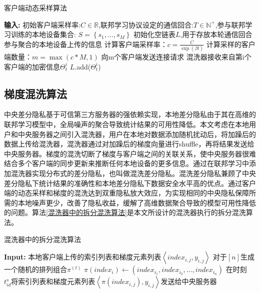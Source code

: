 \begin{algorithm}[!htb]
	\caption{客户端动态采样算法}
	\label{客户端动态采样算法}
	\begin{algorithmic}[1]
		\footnotesize
		\STATE \textbf{输入:} 初始客户端采样率:$C \in \mathbb{R}$,联邦学习协议设定的通信回合:$T \in \mathbb{N}^{+}$,参与联邦学习训练的本地设备集合: $S=\left\{s_{1}, \ldots, s_{M}\right\}$
			\STATE 初始化空链表$L$,用于存放本轮通信回合参与聚合的本地设备上传的信息
			\STATE 计算客户端采样率：$c=\frac{C}{\exp (\beta t)}$
			\STATE 计算采样的客户端数量：$m=\max (c * M, 1)$
				\STATE 向m个客户端发送连接请求
					\STATE 混洗器接收来自第i个客户端的加密信息$\Theta_{t}^{i}$
					\STATE $L$.add($\Theta_{t}^{i}$)
				\ENDIF
			\ENDWHILE
		\ENDFOR
	\end{algorithmic}
\end{algorithm}

\subsection{梯度混洗算法}
中央差分隐私基于可信第三方服务器的强依赖实现，本地差分隐私由于其在高维的联邦学习模型中，全局噪声的聚合导致统计结果的可用性降低。本文考虑在本地用户和中央服务器之间引入混洗器，用户在本地对数据添加随机扰动后，将加躁后的数据上传给混洗器，混洗器通过对加躁后的梯度向量进行shuffle，再将结果发送给中央服务器。梯度的混洗切断了梯度与客户端之间的关联关系，使中央服务器很难结合多个客户端的同步更新来推断任何本地设备的更多信息。通过在联邦学习中添加混洗器实现分布式的差分隐私，也叫做混洗差分隐私。混洗差分隐私兼顾了中央差分隐私下统计结果的准确性和本地差分隐私下数据安全水平高的优点。通过客户端的动态采样和梯度的混洗达到双重隐私放大效应，为实现相同的中央隐私保障所需的本地噪声更少，改善了隐私收益，缓解了高维数据聚合导致的模型可用性降低的问题。算法\ref{混洗器中的拆分混洗算法}是本文所设计的混洗器执行的拆分混洗算法。

\begin{algorithm}[!htb]
	\caption{混洗器中的拆分混洗算法}
	\label{混洗器中的拆分混洗算法}
	\begin{algorithmic}[1]
		\footnotesize
		\STATE \textbf{Input:} 本地客户端上传的索引列表和梯度元素列表$\left\langle index_{i,j}, y_{i,j}\right\rangle$
	    \STATE 对于$[n]$生成一个随机的排列组合$\pi^{(t)}$
	    \STATE $\pi(index_{i}) \leftarrow\left(index_{i_{1}},index_{i_{2}}, \ldots, index_{i_{n}}\right)$
	    \ENDFOR
	    \STATE 在时刻 $t_{i d}^{s}$将索引列表和梯度元素列表$\left\langle \pi(index_{i,j}), y_{i,j}\right\rangle$发送给中央服务器
	\end{algorithmic}
\end{algorithm}

